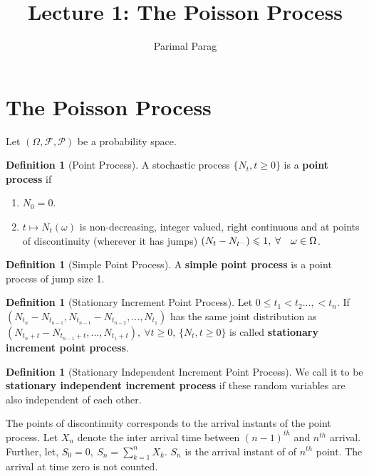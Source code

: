 \documentclass[a4paper,10pt]{article}
\date{}
\title{Lecture 1: The Poisson Process}
\author{Parimal Parag}
\theoremstyle{plain}
\theoremstyle{definition}
\newtheorem{defn}[thm]{Definition}
\begin{document}
\maketitle

\section{The Poisson Process}
Let \noindent $(\Omega, \mathcal{F}, \mathcal{P})$ be a probability space.
\begin{defn}[Point Process] A stochastic process $\{N_{t}, t\geqslant 0\}$ is a \textbf{point process} if
\begin{enumerate}
  \item $N_{0} = 0$.
  \item $t\mapsto N_{t} (\omega)$ is non-decreasing, integer valued, right continuous and at points of discontinuity (wherever it has jumps) $(N_{t}- N_{t^{-}})\leqslant 1, \hspace{0.1cm} \forall \quad \omega \in \Omega$. 
\end{enumerate}
\end{defn} 
\begin{defn}[Simple Point Process] A \textbf{simple point process} is a point process of jump size 1.
\end{defn}

\begin{defn}[Stationary Increment Point Process] Let $0\leq t_{1}<t_{2}...,<t_{n}$. If $(N_{t_{n}}-N_{t_{n-1}},N_{t_{n-1}}-N_{t_{n-2}},...,N_{t_{1}})$ has the same joint distribution as $(N_{t_{n}+t}-N_{t_{n-1}+t},...,N_{t_{1}+t}), ~ \forall t \geqslant 0$, $\{N_{t}, t\geqslant 0\}$ is called \textbf{stationary increment point process}.
\end{defn}
\begin{defn}[Stationary Independent Increment Point Process]  We call it to be \textbf{stationary independent increment process} if these random variables are also independent of each other.
\end{defn}

\begin{figure}[hhhh]
\center
	
\end{figure}
\noindent The points of discontinuity corresponds to the arrival instants of the point process. Let $X_{n}$  denote the inter arrival time between $(n-1)^{th}$ and $n^{th}$ arrival. Further, let, $S_{0}=0,~ S_{n}= \sum^{n}_{k=1}X_{k}$. $S_{n}$ is the arrival instant of of $n^{th}$ point. The arrival at time zero is not counted.
\end{document}
